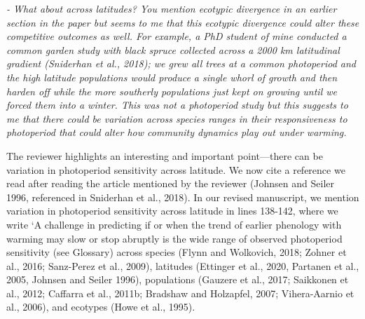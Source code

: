 \documentclass{article}
\begin{document}
 \par \emph{- What about across latitudes? You mention ecotypic divergence in an earlier section in the paper but seems to me that this ecotypic divergence could alter these competitive outcomes as well. For example, a PhD student of mine conducted a common garden study with black spruce collected across a 2000 km latitudinal gradient (Sniderhan et al., 2018); we grew all trees at a common photoperiod and the high latitude populations would produce a single whorl of growth and then harden off while the more southerly populations just kept on growing until we forced them into a winter. This was not a photoperiod study but this suggests to me that there could be variation across species ranges in their responsiveness to photoperiod that could alter how community dynamics play out under warming.}
\par The reviewer highlights an interesting and important point---there can be variation in photoperiod sensitivity across latitude. We now cite a reference we read after reading the article mentioned by the reviewer (Johnsen and Seiler 1996, referenced in Sniderhan et al., 2018). In our revised manuscript, we mention variation in photoperiod sensitivity across latitude in lines 138-142, where we write `A challenge in predicting if or when the trend of earlier phenology with warming may slow or stop abruptly is the wide range of observed photoperiod sensitivity (see Glossary) across species (Flynn and Wolkovich, 2018; Zohner et al., 2016; Sanz-Perez et al., 2009), latitudes (Ettinger et al., 2020, Partanen et al., 2005, Johnsen and Seiler 1996), populations (Gauzere et al., 2017; Saikkonen et al., 2012; Caffarra et al., 2011b; Bradshaw and Holzapfel, 2007; Vihera-Aarnio et al., 2006), and ecotypes (Howe et al., 1995).
\end{document}
